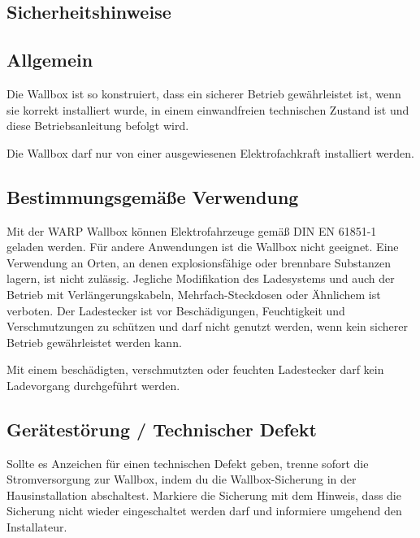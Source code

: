 \documentclass[a4paper,10pt]{article}
\newcommand{\hint}[1]{\begin{tcolorbox}[colback=boxgray,colframe=black,coltext=
white,title=Hinweis]#1\end{tcolorbox}}
\begin{document}
\begin{multicols*}{2}
	\newpage
	\section{Sicherheitshinweise}
	\subsection{Allgemein}
	Die Wallbox ist so konstruiert, dass ein sicherer Betrieb gewährleistet ist,
	wenn sie korrekt installiert wurde, in einem einwandfreien technischen Zustand
	ist und diese Betriebsanleitung befolgt wird. \hint{Die Wallbox darf nur von einer ausgewiesenen Elektrofachkraft installiert
		werden.}

	\subsection{Bestimmungsgemäße Verwendung}
	Mit der WARP Wallbox können Elektrofahrzeuge gemäß DIN EN 61851-1 geladen
	werden. Für andere Anwendungen ist die Wallbox nicht geeignet. Eine Verwendung
	an Orten, an denen explosionsfähige oder brennbare Substanzen lagern, ist nicht
	zulässig. Jegliche Modifikation des Ladesystems und auch der Betrieb mit
	Verlängerungskabeln, Mehrfach-Steckdosen oder Ähnlichem ist verboten. Der
	Ladestecker ist vor Beschädigungen, Feuchtigkeit und Verschmutzungen zu
	schützen und darf nicht genutzt werden, wenn kein sicherer Betrieb
	gewährleistet werden kann. \hint{Mit einem beschädigten, verschmutzten oder feuchten Ladestecker darf kein Ladevorgang durchgeführt
		werden.}

	\subsection{Gerätestörung / Technischer Defekt}
	Sollte es Anzeichen für einen technischen Defekt geben, trenne sofort die
	Stromversorgung zur Wallbox, indem du die Wallbox-Sicherung in der
	Hausinstallation abschaltest. Markiere die Sicherung mit dem Hinweis, dass die
	Sicherung nicht wieder eingeschaltet werden darf und informiere umgehend den
	Installateur.


\end{multicols*}
\end{document}
